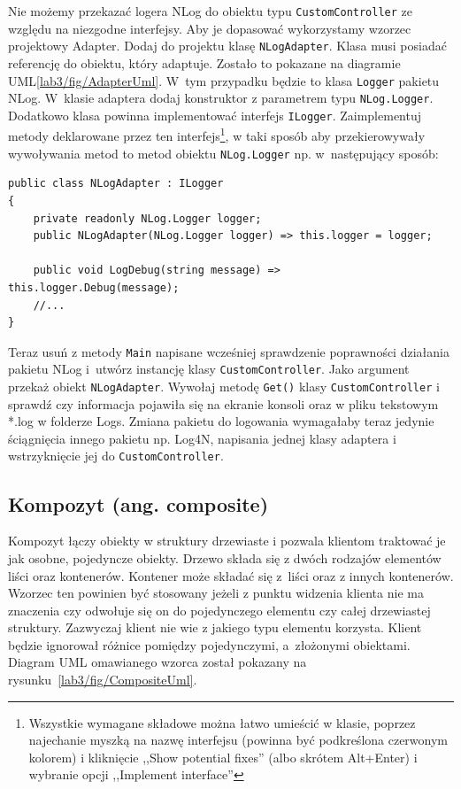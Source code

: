 Nie możemy przekazać logera NLog do obiektu typu \texttt{CustomController} ze względu na niezgodne interfejsy. Aby je dopasować wykorzystamy wzorzec projektowy Adapter. Dodaj do projektu klasę \texttt{NLogAdapter}. Klasa musi posiadać referencję do obiektu, który adaptuje. Zostało to pokazane na diagramie UML\ref{lab3/fig/AdapterUml}. W~tym przypadku będzie to klasa \texttt{Logger} pakietu NLog. W~klasie adaptera dodaj konstruktor z parametrem typu \texttt{NLog.Logger}. Dodatkowo klasa powinna implementować interfejs \texttt{ILogger}. Zaimplementuj metody deklarowane przez ten interfejs\footnote{Wszystkie wymagane składowe można łatwo umieścić w klasie, poprzez najechanie myszką na nazwę interfejsu (powinna być podkreślona czerwonym kolorem) i kliknięcie ,,Show potential fixes'' (albo skrótem Alt+Enter) i wybranie opcji ,,Implement interface''}, w taki sposób aby przekierowywały wywoływania metod to metod obiektu \texttt{NLog.Logger} np. w~następujący sposób:
\begin{lstlisting}[caption={Fragment klasy adaptera dla pakietu NLog}, label={lab3/lst/nlogAdapter}]
public class NLogAdapter : ILogger
{
	private readonly NLog.Logger logger;	
	public NLogAdapter(NLog.Logger logger) => this.logger = logger;	
	
	public void LogDebug(string message) => this.logger.Debug(message);	
	//...
}
\end{lstlisting}

Teraz usuń z metody \texttt{Main} napisane wcześniej sprawdzenie poprawności działania pakietu NLog i~utwórz instancję klasy \texttt{CustomController}. Jako argument przekaż obiekt \texttt{NLogAdapter}. Wywołaj metodę \texttt{Get()} klasy \texttt{CustomController} i sprawdź czy informacja pojawiła się na ekranie konsoli oraz w pliku tekstowym *.log w folderze Logs. Zmiana pakietu do logowania wymagałaby teraz jedynie ściągnięcia innego pakietu np. Log4N, napisania jednej klasy adaptera i wstrzyknięcie jej do \texttt{CustomController}.

\subsection{Kompozyt (ang. composite)}

Kompozyt łączy obiekty w struktury drzewiaste i pozwala klientom traktować je jak osobne, pojedyncze obiekty. Drzewo składa się z dwóch rodzajów elementów liści oraz kontenerów. Kontener może składać się z~liści oraz z innych kontenerów. Wzorzec ten powinien być stosowany jeżeli z punktu widzenia klienta nie ma znaczenia czy odwołuje się on do pojedynczego elementu czy całej drzewiastej struktury. Zazwyczaj klient nie wie z jakiego typu elementu korzysta. Klient będzie ignorował różnice pomiędzy pojedynczymi, a~złożonymi obiektami. Diagram UML omawianego wzorca został pokazany na rysunku~\ref{lab3/fig/CompositeUml}.


